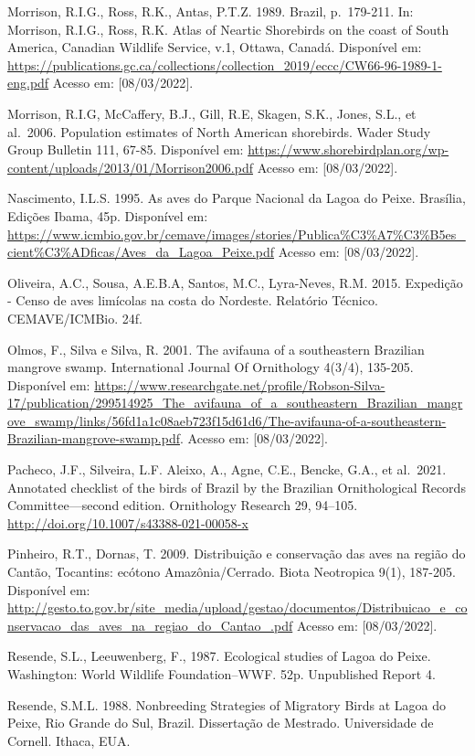 \documentclass[
  oneside]{scrbook}
\begin{document}
Morrison, R.I.G., Ross, R.K., Antas, P.T.Z. 1989. Brazil, p.~179-211. In: Morrison, R.I.G., Ross, R.K. Atlas of Neartic Shorebirds on the coast of South America, Canadian Wildlife Service, v.1, Ottawa, Canadá. Disponível em: \url{https://publications.gc.ca/collections/collection_2019/eccc/CW66-96-1989-1-eng.pdf} Acesso em: {[}08/03/2022{]}.

Morrison, R.I.G, McCaffery, B.J., Gill, R.E, Skagen, S.K., Jones, S.L., et al.~2006. Population estimates of North American shorebirds. Wader Study Group Bulletin 111, 67-85. Disponível em: \url{https://www.shorebirdplan.org/wp-content/uploads/2013/01/Morrison2006.pdf} Acesso em: {[}08/03/2022{]}.

Nascimento, I.L.S. 1995. As aves do Parque Nacional da Lagoa do Peixe. Brasília, Edições Ibama, 45p. Disponível em: \url{https://www.icmbio.gov.br/cemave/images/stories/Publica\%C3\%A7\%C3\%B5es_cient\%C3\%ADficas/Aves_da_Lagoa_Peixe.pdf} Acesso em: {[}08/03/2022{]}.

Oliveira, A.C., Sousa, A.E.B.A, Santos, M.C., Lyra-Neves, R.M. 2015. Expedição - Censo de aves limícolas na costa do Nordeste. Relatório Técnico. CEMAVE/ICMBio. 24f.

Olmos, F., Silva e Silva, R. 2001. The avifauna of a southeastern Brazilian mangrove swamp. International Journal Of Ornithology 4(3/4), 135-205. Disponível em: \url{https://www.researchgate.net/profile/Robson-Silva-17/publication/299514925_The_avifauna_of_a_southeastern_Brazilian_mangrove_swamp/links/56fd1a1c08aeb723f15d61d6/The-avifauna-of-a-southeastern-Brazilian-mangrove-swamp.pdf}. Acesso em: {[}08/03/2022{]}.

Pacheco, J.F., Silveira, L.F. Aleixo, A., Agne, C.E., Bencke, G.A., et al.~2021. Annotated checklist of the birds of Brazil by the Brazilian Ornithological Records Committee---second edition. Ornithology Research 29, 94--105. \url{http://doi.org/10.1007/s43388-021-00058-x}

Pinheiro, R.T., Dornas, T. 2009. Distribuição e conservação das aves na região do Cantão, Tocantins: ecótono Amazônia/Cerrado. Biota Neotropica 9(1), 187-205. Disponível em: \url{http://gesto.to.gov.br/site_media/upload/gestao/documentos/Distribuicao_e_conservacao_das_aves_na_regiao_do_Cantao_.pdf} Acesso em: {[}08/03/2022{]}.

Resende, S.L., Leeuwenberg, F., 1987. Ecological studies of Lagoa do Peixe. Washington: World Wildlife Foundation--WWF. 52p. Unpublished Report 4.

Resende, S.M.L. 1988. Nonbreeding Strategies of Migratory Birds at Lagoa do Peixe, Rio Grande do Sul, Brazil. Dissertação de Mestrado. Universidade de Cornell. Ithaca, EUA.
\end{document}
